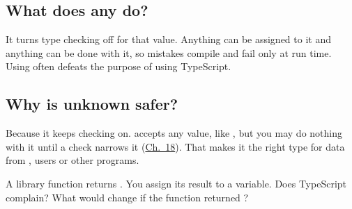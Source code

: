 \label{ch:c20}

\subsection{What does any do?}%
It turns type checking off for that value. Anything can be assigned to it and anything can be done with it, so mistakes compile and fail only at run time. Using  often defeats the purpose of using TypeScript.

\subsection{Why is unknown safer?}%
Because it keeps checking on.  accepts any value, like , but you may do nothing with it until a check narrows it (\hyperref[ch:c18]{Ch.~18}). That makes it the right type for data from , users or other programs.

\begin{ponder}A library function returns . You assign its result to a  variable. Does TypeScript complain? What would change if the function returned ?\end{ponder}
